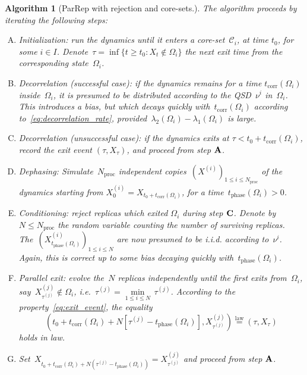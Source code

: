 \documentclass[a4]{article}
\newcommand{\1}{\mathbbm 1}
\newcommand{\corr}{\mathrm{corr}}
\newcommand{\phase}{\mathrm{phase}}
\newtheorem{algorithm}{Algorithm}
\begin{document}
    \begin{algorithm}[ParRep with rejection and core-sets.]
        \label{alg:parrep}
        The algorithm proceeds by iterating the following steps:
        \begin{enumerate}[A.]
            \item[\bf{A}]{Initialization: run the dynamics until it enters a core-set~$\mathcal C_i$, at time $t_0$, for some $i\in I$. Denote~$\tau =\inf\{t\geq t_0: X_t\not\in\Omega_i\}$ the next exit time from the corresponding state~$\Omega_i$.}
            \item[\bf{B1}]{Decorrelation (successful case): if the dynamics remains for a time $t_{\corr}(\Omega_i)$ inside~$\Omega_i$, it is presumed to be distributed according to the QSD~$\nu^i$ in~$\Omega_i$. This introduces a bias, but which decays quickly with~$t_{\corr}(\Omega_i)$ according to~\eqref{eq:decorrelation_rate}, provided~$\lambda_2(\Omega_i)-\lambda_1(\Omega_i)$ is large.}
            \item[\bf{B2}]{Decorrelation (unsuccessful case): if the dynamics exits at $\tau < t_0 + t_{\corr}(\Omega_i)$, record the exit event $(\tau,X_\tau)$, and proceed from step $\text{\bf A}$.}
            \item[\bf{C}]{Dephasing: Simulate~$N_{\mathrm{proc}}$ independent copies~$\left(X^{(i)}\right)_{1\leq i\leq N_{\mathrm{proc}}}$ of the dynamics starting from $X_0^{(i)}=X_{t_0+t_{\corr}(\Omega_i)}$, for a time~$t_{\phase}(\Omega_i)>0$.}
            \item[\bf{D}]{Conditioning: reject replicas which exited $\Omega_i$ during step $\text{\bf C}$. Denote by~$N \leq N_{\mathrm{proc}}$ the random variable counting the number of surviving replicas. The~$(X_{t_{\phase}(\Omega_i)}^{(i)})_{1\leq i\leq N}$ are now presumed to be i.i.d. according to~$\nu^i$. Again, this is correct up to some bias decaying quickly with~$t_{\phase}(\Omega_i)$.}
            \item[\bf{E}]{Parallel exit: evolve the~$N$ replicas independently until the first exits from~$\Omega_i$, say~$X_{\tau^{(j)}}^{(j)}\not\in\Omega_i$, i.e.~$\tau^{(j)} = \underset{1\leq i\leq N}{\min}\,\tau^{(j)}$. According to the property~\eqref{eq:exit_event}, the equality~$$\left(t_0+t_{\corr}(\Omega_i) + N\left[\tau^{(j)}-t_{\phase}(\Omega_i)\right],X^{(j)}_{\tau^{(j)}}\right)\overset{\mathrm{law}}{=}(\tau,X_{\tau})$$ holds in law.}
            \item[\bf{F}]{Set~$X_{t_0+t_{\corr}(\Omega_i) + N(\tau^{(j)}-t_{\phase}(\Omega_i))} = X_{\tau^{(j)}}^{(j)}$ and proceed from step {$\text{\bf A}$}.}
        \end{enumerate}
    \end{algorithm}
\end{document}
